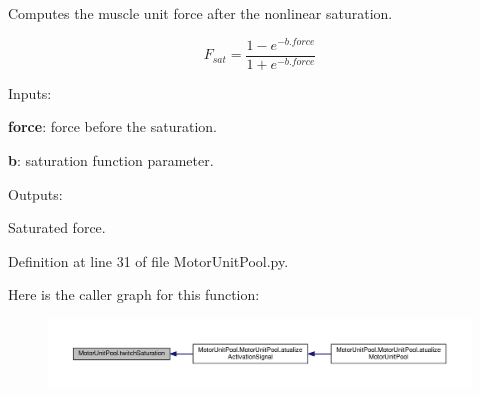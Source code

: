Computes the muscle unit force after the nonlinear saturation. 

\begin{equation} F_{sat} = \frac{1-e^{-b.force}}{1+e^{-b.force}} \end{equation}


\begin{DoxyItemize}
\item Inputs\-:
\begin{DoxyItemize}
\item {\bfseries force}\-: force before the saturation.
\item {\bfseries b}\-: saturation function parameter.
\end{DoxyItemize}
\item Outputs\-:
\begin{DoxyItemize}
\item Saturated force. 
\end{DoxyItemize}
\end{DoxyItemize}

Definition at line 31 of file Motor\-Unit\-Pool.\-py.



Here is the caller graph for this function\-:\nopagebreak
\begin{figure}[H]
\begin{center}
\leavevmode
\includegraphics[width=350pt]{namespace_motor_unit_pool_a3ed1b9ccd29068fac93964327dd54bf9_icgraph}
\end{center}
\end{figure}


